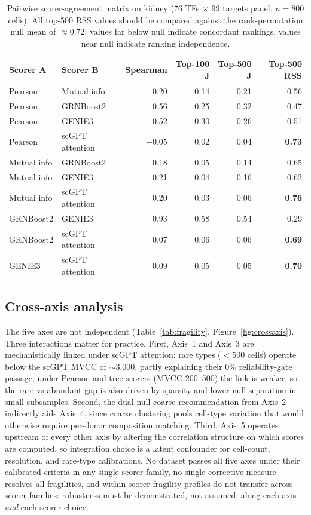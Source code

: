 \documentclass[12pt]{article}
\begin{document}
\begin{table}[ht]
\centering
\caption{Pairwise scorer-agreement matrix on kidney
(76 TFs $\times$ 99 targets panel, $n = 800$ cells). All top-500 RSS
values should be compared against the rank-permutation null mean of
$\approx 0.72$: values far below null indicate concordant rankings,
values near null indicate ranking independence.}
\label{tab:scorer_divergence}
\small
\begin{tabular}{llrrrr}
\toprule
\textbf{Scorer A} & \textbf{Scorer B} & \textbf{Spearman} & \textbf{Top-100 J} & \textbf{Top-500 J} & \textbf{Top-500 RSS} \\
\midrule
Pearson & Mutual info        & 0.20  & 0.14 & 0.21 & 0.56 \\
Pearson & GRNBoost2          & 0.56  & 0.25 & 0.32 & 0.47 \\
Pearson & GENIE3             & 0.52  & 0.30 & 0.26 & 0.51 \\
Pearson & scGPT attention    & $-$0.05 & 0.02 & 0.04 & \textbf{0.73} \\
Mutual info & GRNBoost2      & 0.18  & 0.05 & 0.14 & 0.65 \\
Mutual info & GENIE3         & 0.21  & 0.04 & 0.16 & 0.62 \\
Mutual info & scGPT attention & 0.20 & 0.03 & 0.06 & \textbf{0.76} \\
GRNBoost2 & GENIE3           & 0.93  & 0.58 & 0.54 & 0.29 \\
GRNBoost2 & scGPT attention  & 0.07  & 0.06 & 0.06 & \textbf{0.69} \\
GENIE3 & scGPT attention     & 0.09  & 0.05 & 0.05 & \textbf{0.70} \\
\bottomrule
\end{tabular}
\end{table}

\subsection{Cross-axis analysis}

The five axes are not independent
(Table~\ref{tab:fragility}, Figure~\ref{fig:crossaxis}). Three
interactions matter for practice. First, Axis~1 and Axis~3 are
mechanistically linked under scGPT attention: rare types ($<\!500$
cells) operate below the scGPT MVCC of $\sim$3{,}000, partly
explaining their 0\% reliability-gate passage; under Pearson and tree
scorers (MVCC 200--500) the link is weaker, so the rare-vs-abundant
gap is also driven by sparsity and lower null-separation in small
subsamples. Second, the dual-null coarse recommendation from Axis~2
indirectly aids Axis~4, since coarse clustering pools cell-type
variation that would otherwise require per-donor composition matching.
Third, Axis~5 operates upstream of every other axis by altering the
correlation structure on which scores are computed, so integration
choice is a latent confounder for cell-count, resolution, and rare-type
calibrations. No dataset passes all five axes under their calibrated
criteria in any single scorer family, no single corrective measure
resolves all fragilities, and within-scorer fragility profiles do not
transfer across scorer families: robustness must be demonstrated, not
assumed, along each axis \emph{and} each scorer choice.
\end{document}
